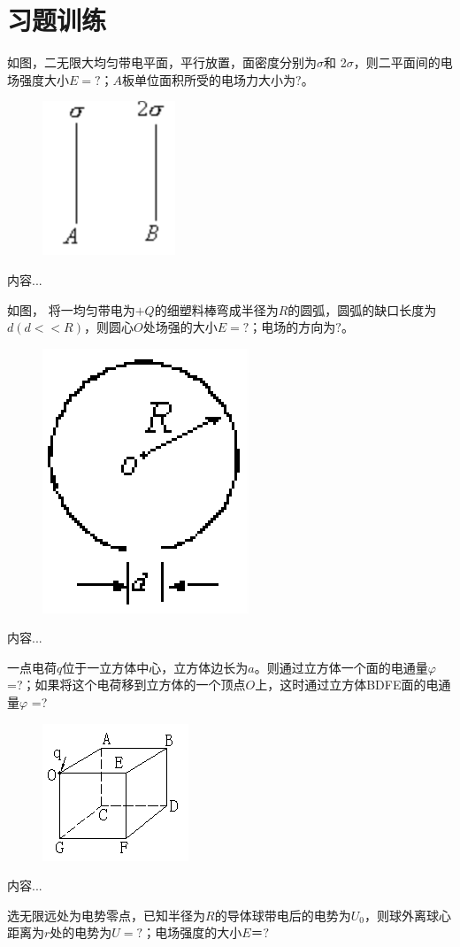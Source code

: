\documentclass[lang=cn,10pt]{elegantbook}
\begin{document}
		\section{习题训练}
		\begin{exercise}
			如图，二无限大均匀带电平面，平行放置，面密度分别为$\sigma$和 2$\sigma$，则二平面间的电场强度大小$E =?$；$A$板单位面积所受的电场力大小为$?$。
\begin{figure}[H]
	\centering
	\includegraphics[width=0.1\linewidth]{image/图片1}
	\caption{}
	\label{fig:1}
\end{figure}
		\end{exercise}
		\begin{solution}
			内容...
		\end{solution}
		\begin{exercise}
			如图， 将一均匀带电为$+Q$的细塑料棒弯成半径为$R$的圆弧，圆弧的缺口长度为$d ( d<<R)$，则圆心$O$处场强的大小$E=?$；电场的方向为$?$。
\begin{figure}[H]
	\centering
	\includegraphics[width=0.1\linewidth]{image/图片2}
	\caption{}
	\label{fig:2}
\end{figure}
		\end{exercise}
		\begin{solution}
			内容...
		\end{solution}
		\begin{exercise}
			一点电荷$q$位于一立方体中心，立方体边长为$a$。则通过立方体一个面的电通量$\varphi$ =?；如果将这个电荷移到立方体的一个顶点$O$上，这时通过立方体BDFE面的电通量$\varphi$ =?			
\begin{figure}[H]
	\centering
	\includegraphics[width=0.1\linewidth]{image/图片3}
	\caption{}
	\label{fig:3}
\end{figure}
		\end{exercise}
		\begin{solution}
			内容...
		\end{solution}
		\begin{exercise}
			选无限远处为电势零点，已知半径为$R$的导体球带电后的电势为$U_{0}$，则球外离球心距离为$r$处的电势为$U=?$；电场强度的大小$E＝?$
		\end{exercise}
\end{document}
